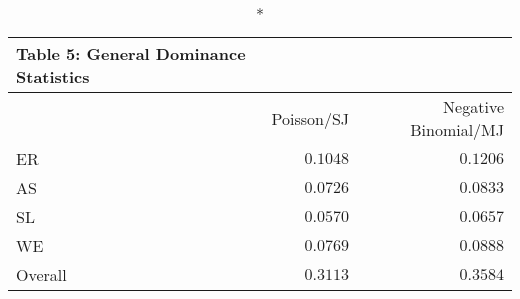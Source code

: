 \begin{longtable}{l|rr}
\caption*{
{\large Table 5: General Dominance Statistics}
} \\ 
\toprule
\multicolumn{1}{l}{} & Poisson/SJ & Negative Binomial/MJ \\ 
\midrule
ER & $0.1048$ & $0.1206$ \\ 
AS & $0.0726$ & $0.0833$ \\ 
SL & $0.0570$ & $0.0657$ \\ 
WE & $0.0769$ & $0.0888$ \\ 
Overall & $0.3113$ & $0.3584$ \\ 
\bottomrule
\end{longtable}

